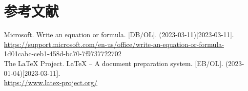 \section*{参考文献}
{}
Microsoft. Write an equation or formula. [DB/OL]. (2023-03-11)[2023-03-11]. \\ \url{https://support.microsoft.com/en-us/office/write-an-equation-or-formula-1d01cabc-ceb1-458d-bc70-7f9737722702}
\\
The
\LaTeX
Project.
\LaTeX
– A document preparation system. [EB/OL]. (2023-01-04)[2023-03-11]. \\ \url{https://www.latex-project.org/}

